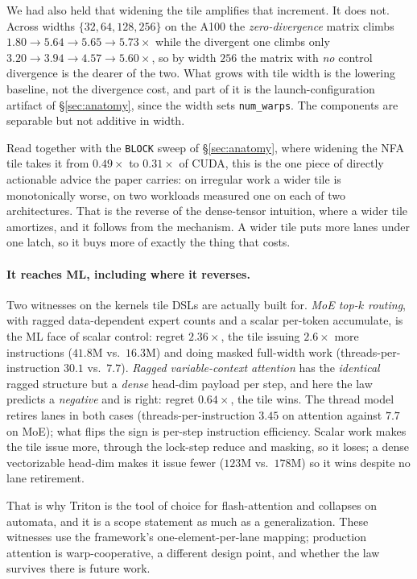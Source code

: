 \documentclass[sigplan,review,nonacm,10pt]{acmart}
\begin{document}
We had also held that widening the tile amplifies that increment. It does not. Across
widths $\{32,64,128,256\}$ on the A100 the \emph{zero-divergence} matrix climbs
$1.80\rightarrow5.64\rightarrow5.65\rightarrow5.73\times$ while the divergent one climbs
only $3.20\rightarrow3.94\rightarrow4.57\rightarrow5.60\times$, so by width $256$ the
matrix with \emph{no} control divergence is the dearer of the two. What grows with tile
width is the lowering baseline, not the divergence cost, and part of it is the
launch-configuration artifact of \S\ref{sec:anatomy}, since the width sets
\texttt{num\_warps}. The components are separable but not additive in width.

Read together with the \texttt{BLOCK} sweep of \S\ref{sec:anatomy}, where widening the
NFA tile takes it from $0.49\times$ to $0.31\times$ of CUDA, this is the one piece of
directly actionable advice the paper carries: on irregular work a wider tile is
monotonically worse, on two workloads measured one on each of two architectures. That is the reverse of the
dense-tensor intuition, where a wider tile amortizes, and it follows from the mechanism.
A wider tile puts more lanes under one latch, so it buys more of exactly the thing that
costs.

\paragraph{It reaches ML, including where it reverses.} Two witnesses on the kernels tile
DSLs are actually built for. \emph{MoE top-$k$ routing}, with ragged data-dependent expert
counts and a scalar per-token accumulate, is the ML face of scalar control: regret
$2.36\times$, the tile issuing $2.6\times$ more instructions ($41.8$M vs.\ $16.3$M) and
doing masked full-width work (threads-per-instruction $30.1$ vs.\ $7.7$).
\emph{Ragged variable-context attention} has the \emph{identical} ragged structure but a
\emph{dense} head-dim payload per step, and here the law predicts a \emph{negative} and is
right: regret $0.64\times$, the tile wins. The thread model retires lanes in both cases
(threads-per-instruction $3.45$ on attention against $7.7$ on MoE); what flips the sign is
per-step instruction efficiency. Scalar work makes the tile issue
more, through the lock-step reduce and masking, so it loses; a dense vectorizable head-dim
makes it issue fewer ($123$M vs.\ $178$M) so it wins despite no lane retirement.

That is why Triton is the tool of choice for flash-attention and collapses on automata, and
it is a scope statement as much as a generalization. These witnesses use the framework's
one-element-per-lane mapping; production attention is warp-cooperative, a different design
point, and whether the law survives there is future work.
\end{document}
